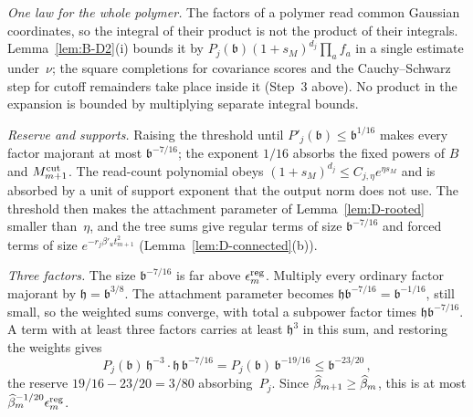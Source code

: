 \emph{One law for the whole polymer.} The factors of a polymer read common Gaussian coordinates, so the integral of their product is not the product of their integrals. Lemma~\ref{lem:B-D2}(i) bounds it by $P_j(\mathfrak b)(1+s_M)^{d_j}\prod_af_a$ in a single estimate under~$\nu$; the square completions for covariance scores and the Cauchy--Schwarz step for cutoff remainders take place inside it (Step~3 above). No product in the expansion is bounded by multiplying separate integral bounds.

\emph{Reserve and supports.} Raising the threshold until $P'_j(\mathfrak b)\le\mathfrak b^{1/16}$ makes every factor majorant at most $\mathfrak b^{-7/16}$; the exponent $1/16$ absorbs the fixed powers of $B$ and $M^{\mathrm{cut}}_{m+1}$. The read-count polynomial obeys $(1+s_M)^{d_j}\le C_{j,\eta}e^{\eta s_M}$ and is absorbed by a unit of support exponent that the output norm does not use. The threshold then makes the attachment parameter of Lemma~\ref{lem:D-rooted} smaller than~$\eta$, and the tree sums give regular terms of size $\mathfrak b^{-7/16}$ and forced terms of size $e^{-r_j\beta'_ut_{m+1}^2}$ (Lemma~\ref{lem:D-connected}(b)).

\emph{Three factors.} The size $\mathfrak b^{-7/16}$ is far above $\epsilon^{\rm reg}_m$. Multiply every ordinary factor majorant by $\mathfrak h=\mathfrak b^{3/8}$. The attachment parameter becomes $\mathfrak h\mathfrak b^{-7/16}=\mathfrak b^{-1/16}$, still small, so the weighted sums converge, with total a subpower factor times $\mathfrak h\mathfrak b^{-7/16}$. A term with at least three factors carries at least $\mathfrak h^3$ in this sum, and restoring the weights gives
\begin{equation*}
P_j(\mathfrak b)\,\mathfrak h^{-3}\cdot\mathfrak h\,\mathfrak b^{-7/16}=P_j(\mathfrak b)\,\mathfrak b^{-19/16}\le\mathfrak b^{-23/20}\,,
\end{equation*}
the reserve $19/16-23/20=3/80$ absorbing~$P_j$. Since $\widehat{\beta}_{m+1}\ge\widehat{\beta}_m$, this is at most $\widehat{\beta}_m^{-1/20}\epsilon^{\rm reg}_m$.

